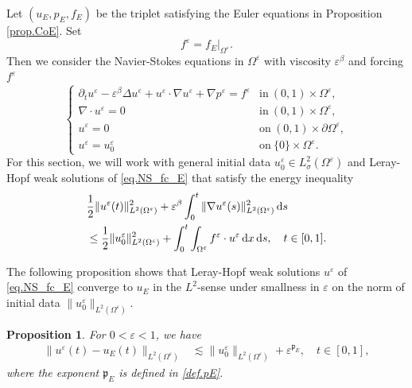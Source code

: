 \documentclass[11pt,a4paper]{article}
\numberwithin{equation}{section}
\newtheorem{proposition}[theorem]{Proposition}
{\theorembodyfont{\rmfamily}\newtheorem{remark}[theorem]{Remark}}
{\theorembodyfont{\rmfamily}\newtheorem{remarks}[theorem]{Remarks}}
\newcommand{\dd}{\,{\rm d}}
\newcommand{\eps}{\varepsilon}
\begin{document}
Let $(u_E, p_E, f_E)$ be the triplet satisfying the Euler equations in Proposition \ref{prop.CoE}. Set 
\[
    f^{\eps} = f_E|_{\Omega^\eps}. 
\]
Then we consider the Navier-Stokes equations in $\Omega^{\eps}$ with viscosity $\eps^\beta$ and forcing $f^{\eps}$ 
\begin{equation}\label{eq.NS_fc_E}
    \left\{
    \begin{array}{ll}
    \partial_t u^\eps - \eps^\beta \Delta u^\eps + u^\eps\cdot\nabla u^\eps + \nabla p^\eps 
    = f^{\eps} &\mbox{in}\ (0,1)\times\Omega^\eps,\\
    \nabla\cdot u^\eps = 0 &\mbox{in}\ (0,1)\times\Omega^\eps,\\
    u^\eps = 0 &\mbox{on}\ (0,1)\times\partial\Omega^\eps,\\
    u^\eps = u^\eps_0 &\mbox{on}\ \{0\}\times\Omega^\eps.
    \end{array}\right.
\end{equation}
For this section, we will work with general initial data $u^\eps_0 \in L^2_\sigma(\Omega^\eps)$ and Leray-Hopf weak solutions of \eqref{eq.NS_fc_E} that satisfy the energy inequality 
\begin{equation}\label{EnIneq}
    \begin{split}
    &\frac12 \|u^\eps(t)\|_{L^2(\Omega^\eps)}^2 
    + \eps^\beta 
    \int_0^t 
    \|\nabla u^\eps(s)\|_{L^2(\Omega^\eps)}^2 
    \dd s \\
    &\le
    \frac12 \|u^\eps_0\|_{L^2(\Omega^\eps)}^2 
    + \int_0^t \int_{\Omega^\eps}
    f^{\eps} \cdot u^\eps
    \dd x \dd s,
    \quad
    t\in [0,1].
    \end{split}
\end{equation}


The following proposition shows that Leray-Hopf weak solutions $u^\eps$ of \eqref{eq.NS_fc_E} converge to $u_E$ in the $L^2$-sense under smallness in $\eps$ on the norm of initial data $\|u^\eps_0\|_{L^2(\Omega^\eps)}$. 


\begin{proposition}\label{prop.RoC.E}
For $0<\eps<1$, we have 
\begin{equation}\label{est1.prop.RoC.E}
    \begin{split}
    \|u^\eps(t)-u_E(t)\|_{L^2(\Omega^\eps)}
    &\lesssim
    \|u^\eps_0\|_{L^2(\Omega^\eps)} 
    + \eps^{\mathfrak p_E},
    \quad
    t\in [0,1], 
    \end{split}
\end{equation}
where the exponent $\mathfrak p_E$ is defined in \eqref{def.pE}.
\end{proposition}
\end{document}
